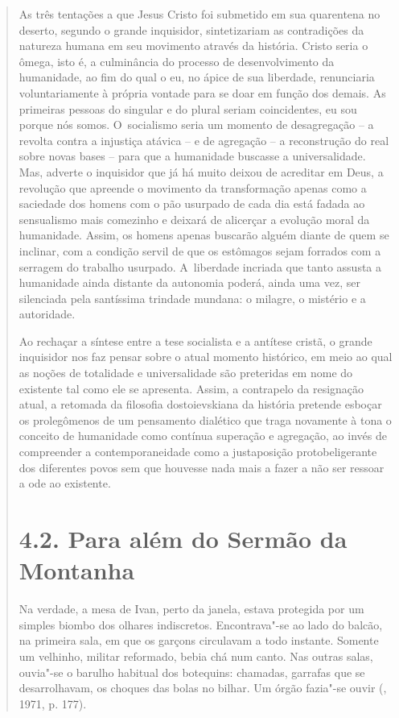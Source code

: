 {\begin{quote}
As três tentações a que Jesus Cristo foi submetido em sua quarentena no
deserto, segundo o grande inquisidor, sintetizariam as contradições da
natureza humana em seu movimento através da história. Cristo seria o
ômega, isto é, a culminância do processo de desenvolvimento da
humanidade, ao fim do qual o eu, no ápice de sua liberdade, renunciaria
voluntariamente à própria vontade para se doar em função dos demais. As
primeiras pessoas do singular e do plural seriam coincidentes, eu sou
porque nós somos. O~socialismo seria um momento de desagregação -- a
revolta contra a injustiça atávica -- e de agregação -- a reconstrução
do real sobre novas bases -- para que a humanidade buscasse a
universalidade. Mas, adverte o inquisidor que já há muito deixou de
acreditar em Deus, a revolução que apreende o movimento da transformação
apenas como a saciedade dos homens com o pão usurpado de cada dia está
fadada ao sensualismo mais comezinho e deixará de alicerçar a evolução
moral da humanidade. Assim, os homens apenas buscarão alguém diante de
quem se inclinar, com a condição servil de que os estômagos sejam
forrados com a serragem do trabalho usurpado. A~liberdade incriada que
tanto assusta a humanidade ainda distante da autonomia poderá, ainda uma
vez, ser silenciada pela santíssima trindade mundana: o milagre, o
mistério e a autoridade.

Ao rechaçar a síntese entre a tese socialista e a antítese cristã, o
grande inquisidor nos faz pensar sobre o atual momento histórico, em
meio ao qual as noções de totalidade e universalidade são preteridas em
nome do existente tal como ele se apresenta. Assim, a contrapelo da
resignação atual, a retomada da filosofia dostoievskiana da história
pretende esboçar os prolegômenos de um pensamento dialético que traga
novamente à tona o conceito de humanidade como contínua superação e
agregação, ao invés de compreender a contemporaneidade como a
justaposição protobeligerante dos diferentes povos sem que houvesse nada
mais a fazer a não ser ressoar a ode ao existente.

\section{4.2. Para além do Sermão da Montanha}

Na verdade, a mesa de Ivan, perto da janela, estava protegida por um
simples biombo dos olhares indiscretos. Encontrava"-se ao lado do balcão,
na primeira sala, em que os garçons circulavam a todo instante. Somente
um velhinho, militar reformado, bebia chá num canto. Nas outras salas,
ouvia"-se o barulho habitual dos botequins: chamadas, garrafas que se
desarrolhavam, os choques das bolas no bilhar. Um órgão fazia"-se ouvir
(, 1971, p. 177).


\end{quote}}
